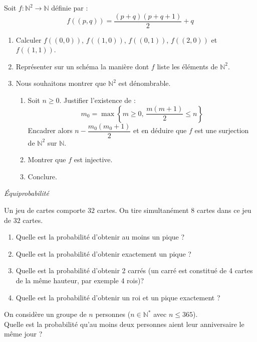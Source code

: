 \documentclass[a4paper,10pt]{report}
\begin{document}
\begin{Exa}[\ding{80}]  Soit $f : \mathbb{N}^2 \rightarrow \mathbb{N}$ définie par :
$$ f((p,q)) = \frac{(p+q)(p+q+1)}{2} + q$$
\begin{enumerate}
\item Calculer $f((0,0))$, $f((1,0))$, $f((0,1))$, $f((2,0))$ et $f((1,1))$.
\item Représenter sur un schéma la manière dont $f$ liste les éléments de $\mathbb{N}^2$.
\item Nous souhaitons montrer que $\mathbb{N}^2$ est dénombrable. 
\begin{enumerate}
\item Soit $n \geq 0$. Justifier l'existence de :
$$ m_0 = \max \left\lbrace m \geq 0, \, \frac{m(m+1)}{2} \leq n \right\rbrace$$
Encadrer alors $n-\dfrac{m_0(m_0+1)}{2}$ et en déduire que $f$ est une surjection de $\mathbb{N}^2$ sur $\mathbb{N}$.
\item Montrer que $f$ est injective.
\item Conclure.
\end{enumerate}
\end{enumerate}
\end{Exa}




\medskip

\begin{center}
\textit{{ {\large Équiprobabilité}}}
\end{center}

\medskip



\begin{Exa} Un jeu de cartes comporte $32$ cartes. On tire simultanément $8$ cartes dans ce jeu de $32$ cartes. 

\begin{enumerate}
\item Quelle est la probabilité d'obtenir au moins un pique ?
\item Quelle est la probabilité d'obtenir exactement un pique ?
\item Quelle est la probabilité d'obtenir 2 carrés (un carré est constitué de 4 cartes de la même hauteur, par exemple 4 rois)?
\item Quelle est la probabilité d'obtenir un roi et un pique exactement ?
\end{enumerate}
\end{Exa} 



\begin{Exa}
On considère un groupe de $n$ personnes ($n \in \mathbb{N}^*$ avec $n \leq 365$).\\
Quelle est la probabilité qu'au moins deux personnes aient leur anniversaire le même jour ?
\end{Exa}
\end{document}
